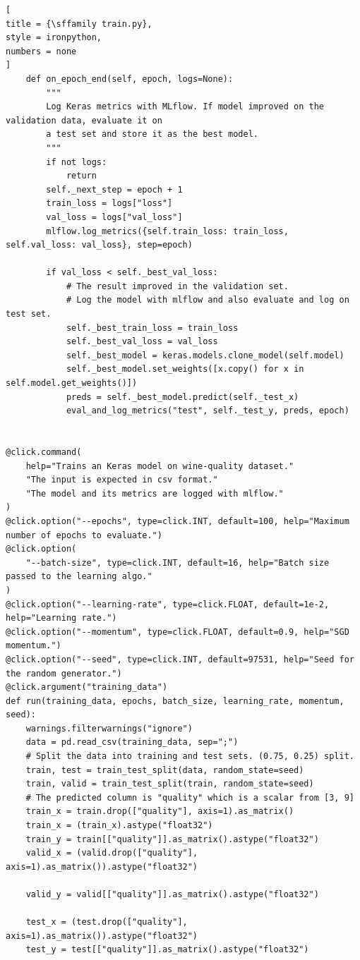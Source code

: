 \documentclass[%
	11pt,
	a4paper,
	utf8,
		]{article}
\begin{document}
\begin{lstlisting}[
title = {\sffamily train.py},
style = ironpython,
numbers = none	
]
	def on_epoch_end(self, epoch, logs=None):
		"""
		Log Keras metrics with MLflow. If model improved on the validation data, evaluate it on
		a test set and store it as the best model.
		"""
		if not logs:
			return
		self._next_step = epoch + 1
		train_loss = logs["loss"]
		val_loss = logs["val_loss"]
		mlflow.log_metrics({self.train_loss: train_loss, self.val_loss: val_loss}, step=epoch)

		if val_loss < self._best_val_loss:
			# The result improved in the validation set.
			# Log the model with mlflow and also evaluate and log on test set.
			self._best_train_loss = train_loss
			self._best_val_loss = val_loss
			self._best_model = keras.models.clone_model(self.model)
			self._best_model.set_weights([x.copy() for x in self.model.get_weights()])
			preds = self._best_model.predict(self._test_x)
			eval_and_log_metrics("test", self._test_y, preds, epoch)


@click.command(
	help="Trains an Keras model on wine-quality dataset."
	"The input is expected in csv format."
	"The model and its metrics are logged with mlflow."
)
@click.option("--epochs", type=click.INT, default=100, help="Maximum number of epochs to evaluate.")
@click.option(
	"--batch-size", type=click.INT, default=16, help="Batch size passed to the learning algo."
)
@click.option("--learning-rate", type=click.FLOAT, default=1e-2, help="Learning rate.")
@click.option("--momentum", type=click.FLOAT, default=0.9, help="SGD momentum.")
@click.option("--seed", type=click.INT, default=97531, help="Seed for the random generator.")
@click.argument("training_data")
def run(training_data, epochs, batch_size, learning_rate, momentum, seed):
	warnings.filterwarnings("ignore")
	data = pd.read_csv(training_data, sep=";")
	# Split the data into training and test sets. (0.75, 0.25) split.
	train, test = train_test_split(data, random_state=seed)
	train, valid = train_test_split(train, random_state=seed)
	# The predicted column is "quality" which is a scalar from [3, 9]
	train_x = train.drop(["quality"], axis=1).as_matrix()
	train_x = (train_x).astype("float32")
	train_y = train[["quality"]].as_matrix().astype("float32")
	valid_x = (valid.drop(["quality"], axis=1).as_matrix()).astype("float32")
	
	valid_y = valid[["quality"]].as_matrix().astype("float32")
	
	test_x = (test.drop(["quality"], axis=1).as_matrix()).astype("float32")
	test_y = test[["quality"]].as_matrix().astype("float32")


\end{lstlisting}
\end{document}
